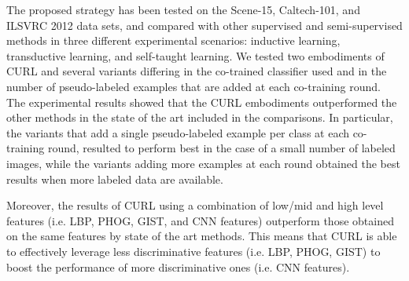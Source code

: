 \documentclass[journal,11pt]{IEEEtran}
\newcommand{\coso}{strategy}
\newcommand{\emb}{embodiment}
\begin{document}
The proposed \coso{ }has been tested on the Scene-15, Caltech-101, and ILSVRC 2012 data sets, and compared with other supervised and semi-supervised methods in three different experimental scenarios: inductive learning, transductive learning, and self-taught learning. We tested two {\emb}s of CURL and several variants differing in the co-trained classifier used and in the number of pseudo-labeled examples that are added at each co-training round. The experimental results showed that the CURL {\emb}s outperformed the other methods in the state of the art included in the comparisons. In particular, the variants that add a single pseudo-labeled example per class at each co-training round, resulted to perform best in the case of a small number of labeled images, while the variants adding more examples at each round obtained the best results when more labeled data are available.

Moreover, the results of CURL using a combination of low/mid and high level features (i.e. LBP, PHOG, GIST, and CNN features) outperform those obtained on the same features by state of the art methods. This means that CURL is able to effectively leverage less discriminative features (i.e. LBP, PHOG, GIST) to boost the performance of more discriminative ones (i.e. CNN features). %




\ifCLASSOPTIONcaptionsoff
  \newpage
\fi






\end{document}
